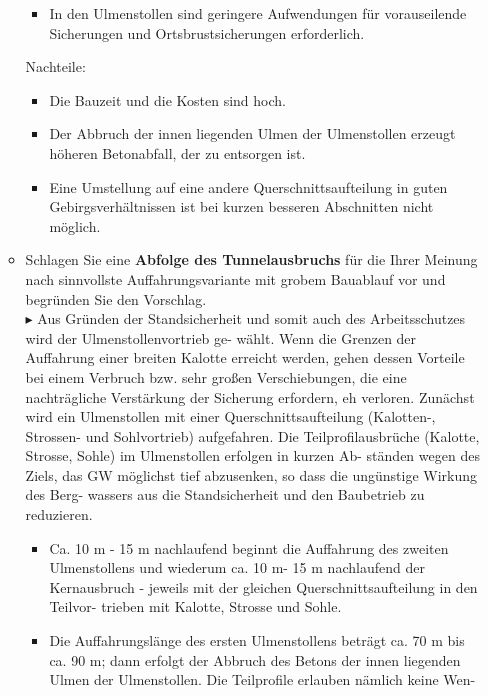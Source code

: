 \documentclass[fleqn,twoside]{article}
\begin{document}
\begin{small}
\begin{itemize}
\begin{itemize}[label={$\blacktriangleright$}]
\begin{itemize}[label={$\blacktriangleright$}]
        \item In den Ulmenstollen sind geringere Aufwendungen für vorauseilende Sicherungen und Ortsbrustsicherungen erforderlich.
        \end{itemize}
        Nachteile:
        \begin{itemize}[label={$\blacktriangleright$}]
        \item Die Bauzeit und die Kosten sind hoch.
        \item Der Abbruch der innen liegenden Ulmen der Ulmenstollen erzeugt höheren Betonabfall, der zu entsorgen ist.
        \item Eine Umstellung auf eine andere Querschnittsaufteilung in guten Gebirgsverhältnissen ist bei kurzen besseren Abschnitten nicht möglich.
        \end{itemize}
        \item Schlagen Sie eine \textbf{Abfolge des Tunnelausbruchs} für die Ihrer Meinung nach sinnvollste Auffahrungsvariante mit grobem Bauablauf vor und begründen Sie den Vorschlag.\\
        $\blacktriangleright$ Aus Gründen der Standsicherheit und somit auch des Arbeitsschutzes wird der Ulmenstollenvortrieb ge-
        wählt. Wenn die Grenzen der Auffahrung einer breiten Kalotte erreicht werden, gehen dessen Vorteile bei
        einem Verbruch bzw. sehr großen Verschiebungen, die eine nachträgliche Verstärkung der Sicherung
        erfordern, eh verloren.
        Zunächst wird ein Ulmenstollen mit einer Querschnittsaufteilung (Kalotten-, Strossen- und Sohlvortrieb)
        aufgefahren. Die Teilprofilausbrüche (Kalotte, Strosse, Sohle) im Ulmenstollen erfolgen in kurzen Ab-
        ständen wegen des Ziels, das GW möglichst tief abzusenken, so dass die ungünstige Wirkung des Berg-
        wassers aus die Standsicherheit und den Baubetrieb zu reduzieren.
        \begin{itemize}[label={$\blacktriangleright$}]
        \item Ca. 10 m - 15 m nachlaufend beginnt die Auffahrung des zweiten Ulmenstollens und wiederum ca. 10
        m- 15 m nachlaufend der Kernausbruch - jeweils mit der gleichen Querschnittsaufteilung in den Teilvor-
        trieben mit Kalotte, Strosse und Sohle.
        \item Die Auffahrungslänge des ersten Ulmenstollens beträgt ca. 70 m bis ca. 90 m; dann erfolgt der Abbruch
        des Betons der innen liegenden Ulmen der Ulmenstollen. Die Teilprofile erlauben nämlich keine Wen-

\end{itemize}
\end{itemize}
\end{itemize}
\end{small}
\end{document}
